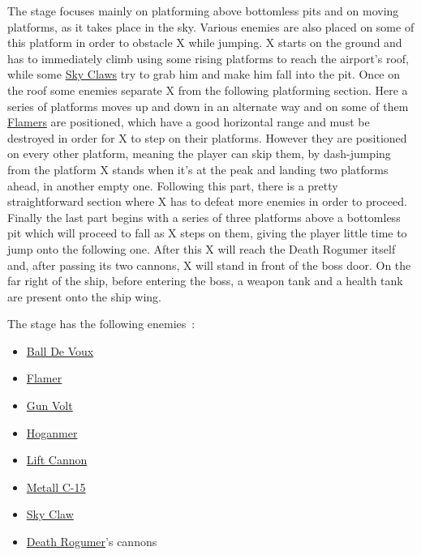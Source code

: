 The stage focuses mainly on platforming above bottomless pits and on moving platforms, as it takes place in the sky. Various enemies are also placed on some of this platform in order to obstacle X while jumping. X starts on the ground and has to immediately climb using some rising platforms to reach the airport's roof, while some \hyperlink{enem:Sky_Claw}{Sky Claws} try to grab him and make him fall into the pit. Once on the roof some enemies separate X from the following  platforming section. Here a series of platforms moves up and down in an alternate way and on some of them \hyperlink{enem:Flamer}{Flamers} are positioned, which have a good horizontal range and must be destroyed in order for X to step on their platforms. However they are positioned on every other platform, meaning the player can skip them, by dash-jumping from the platform X stands when it's at the peak and landing two platforms ahead, in another empty one. Following this part, there is a pretty straightforward section where X has to defeat more enemies in order to proceed. Finally the last part begins with a series of three platforms above a bottomless pit which will proceed to fall as X steps on them, giving the player little time to jump onto the following one. After this X will reach the Death Rogumer itself and, after passing its two cannons, X will stand in front of the boss door. On the far right of the ship, before entering the boss, a weapon tank and a health tank are present onto the ship wing.

The stage has the following enemies~\cite{wiki:Airport}:
\begin{itemize}
	\item \hyperlink{enem:Ball_De_Voux}{Ball De Voux }
	\item \hyperlink{enem:Flamer}{Flamer}
	\item \hyperlink{enem:Gun_Volt}{Gun Volt}
	\item \hyperlink{enem:Hoganmer}{Hoganmer}
	\item \hyperlink{enem:Lift_Cannon}{Lift Cannon}
	\item \hyperlink{enem:Metall_C-15}{Metall C-15}
	\item \hyperlink{enem:Sky_Claw}{Sky Claw}
	\item \hyperlink{vehicle:Death_Rogumer}{Death Rogumer}'s cannons
\end{itemize}


